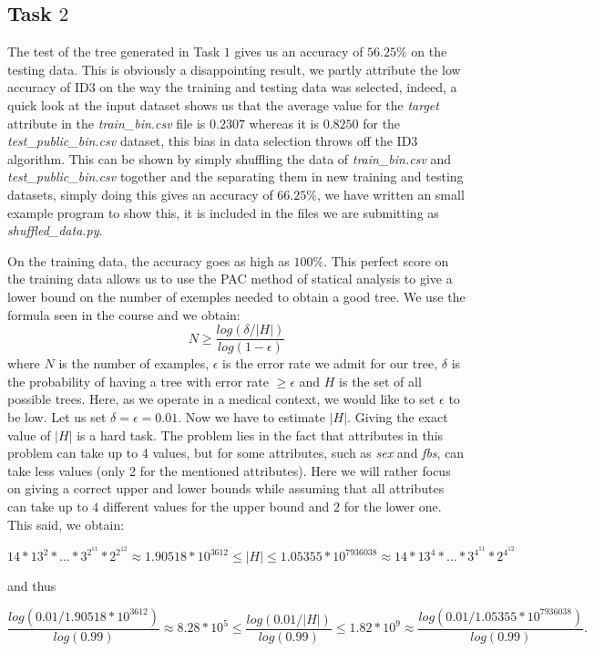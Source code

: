 \documentclass[french]{article}
\begin{document}
		
\subsection{Task $2$}
	The test of the tree generated in Task $1$ gives us an accuracy of $56.25\%$ on the testing data. This is obviously a disappointing result, we partly attribute the low accuracy of ID3 on the way the training and testing data was selected, indeed, a quick look at the input dataset shows us that the average value for the \emph{target} attribute in the \emph{train\_bin.csv} file is $0.2307$ whereas it is $0.8250$ for the \emph{test\_public\_bin.csv} dataset, this bias in data selection throws off the ID3 algorithm. This can be shown by simply shuffling the data of \emph{train\_bin.csv} and \emph{test\_public\_bin.csv} together and the separating them in new training and testing datasets, simply doing this gives an accuracy of $66.25\%$, we have written an small example program to show this, it is included in the files we are submitting as \emph{shuffled\_data.py}.
	
	On the training data, the accuracy goes as high as $100\%$. This perfect score on the training data allows us to use the PAC method of statical analysis to give a lower bound on the number of exemples needed to obtain a good tree. We use the formula seen in the course and we obtain:
	$$N\geq\frac{log(\delta/|H|)}{log(1-\epsilon)}$$
where $N$ is the number of examples, $\epsilon$ is the error rate we admit for our tree, $\delta$ is the probability of having a tree with error rate $\geq\epsilon$ and $H$ is the set of all possible trees. Here, as we operate in a medical context, we would like to set $\epsilon$  to be low. Let us set $\delta=\epsilon= 0.01$. Now we have to estimate $|H|$. Giving the exact value of $|H|$ is a hard task. The problem lies in the fact that attributes in this problem can take up to 4 values, but for some attributes, such as \emph{sex} and \emph{fbs}, can take less values (only 2 for the mentioned attributes). Here we will rather focus on giving a correct upper and lower bounds while assuming that all attributes can take up to $4$ different values for the upper bound and $2$ for the lower one. This said, we obtain:
	
	$$14*13^2*\ldots*3^{2^{11}}*2^{2^{12}}\approx1.90518*10^{3612}\leq|H|\leq 1.05355*10^{7936038}\approx 14*13^4*\ldots*3^{4^{11}}*2^{4^{12}}  $$
	
	and thus 
	
	$$\frac{log(0.01/1.90518*10^{3612})}{log(0.99)}\approx8.28*10^5\leq\frac{log(0.01/|H|)}{log(0.99)}\leq1.82*10^9\approx\frac{log(0.01/1.05355*10^{7936038})}{log(0.99)}.$$
\end{document}
